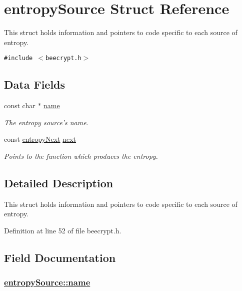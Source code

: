 \hypertarget{structentropySource}{
\section{entropy\-Source Struct Reference}
\label{structentropySource}
}
This struct holds information and pointers to code specific to each source of entropy.  


{\tt \#include $<$beecrypt.h$>$}

\subsection*{Data Fields}
\begin{CompactItemize}
\item 
const char $\ast$ \hyperlink{structentropySource_o0}{name}
\begin{CompactList}\small\item\em The entropy source's name. \item\end{CompactList}\item 
const \hyperlink{group__ES__m_ga0}{entropy\-Next} \hyperlink{structentropySource_o1}{next}
\begin{CompactList}\small\item\em Points to the function which produces the entropy. \item\end{CompactList}\end{CompactItemize}


\subsection{Detailed Description}
This struct holds information and pointers to code specific to each source of entropy. 

Definition at line 52 of file beecrypt.h.

\subsection{Field Documentation}
\hypertarget{structentropySource_o0}{
\subsubsection[name]{\setlength{\rightskip}{0pt plus 5cm}\hyperlink{structentropySource_o0}{entropy\-Source::name}}}
\label{structentropySource_o0}


